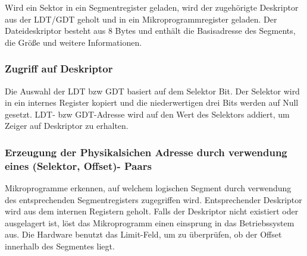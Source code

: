Wird ein Sektor in ein Segmentregister geladen, wird der zugehörigte Deskriptor aus der LDT/GDT geholt und in ein Mikroprogrammregister geladen. Der Dateideskriptor besteht aus 8 Bytes und enthält die Basisadresse des Segments, die Größe und weitere Informationen.

\subsubsection{Zugriff auf Deskriptor}

Die Auswahl der LDT bzw GDT basiert auf dem Selektor Bit. Der Selektor wird in ein internes Register kopiert und die niederwertigen drei Bits werden auf Null gesetzt. LDT- bzw GDT-Adresse wird auf den Wert des Selektors addiert, um Zeiger auf Deskriptor zu erhalten. 

\subsubsection{Erzeugung der Physikalsichen Adresse durch verwendung eines (Selektor, Offset)- Paars}

Mikroprogramme erkennen, auf welchem logischen Segment durch verwendung des entsprechenden Segmentregisters zugegriffen wird. Entsprechender Deskriptor wird aus dem internen Registern geholt. Falls der Deskriptor nicht existiert oder ausgelagert ist, löst das Mikroprogramm einen einsprung in das Betriebssystem aus. Die Hardware benutzt das Limit-Feld, um zu überprüfen, ob der Offset innerhalb des Segmentes liegt.

